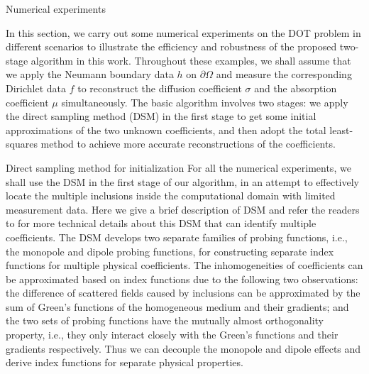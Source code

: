 \documentclass[11pt]{article}%
\renewcommand{\_}{{\fontfamily{ptm}\selectfont\textunderscore}}
\theoremstyle{plain}
\numberwithin{equation}{section}
\begin{document}
\begin{section}{Numerical experiments}\label{sec:Num}

In this section, we carry out some numerical experiments on the DOT problem in different scenarios to illustrate the efficiency 
and robustness of the proposed two-stage algorithm in this work.
Throughout these examples, we shall assume that we apply the Neumann boundary data $h$ on $\partial \Omega$ and measure the corresponding Dirichlet data $f$ to reconstruct the diffusion coefficient $\sigma$ and the absorption coefficient $\mu$ simultaneously. The basic algorithm involves two stages: 
we apply the direct sampling method (DSM) in the first stage to get some initial approximations of the two unknown coefficients, and then adopt the total least-squares method to achieve more accurate reconstructions of the coefficients. 

\begin{subsection}{Direct sampling method for initialization}
For all the numerical experiments, we shall use the DSM in the first stage of our algorithm, in an attempt 
to effectively locate the multiple inclusions inside the computational domain with limited measurement data. 
Here we give a brief description of DSM and refer the readers to \cite{chow2020direct} for more technical details 
about this DSM that can identify multiple coefficients.  The DSM develops two separate families of probing functions, 
i.e., the monopole and dipole probing functions, for constructing separate index functions for multiple physical coefficients. 
The inhomogeneities of coefficients can be approximated based on index functions  due to the following two observations: 
the difference of scattered fields caused by inclusions can be approximated by the sum of Green's functions of the homogeneous medium and their gradients; and the two sets of probing functions  have the mutually almost orthogonality property, i.e., they only interact closely with the Green's functions and their gradients respectively. Thus we can decouple the  monopole and dipole effects and derive index functions for separate physical properties.


\end{subsection}
\end{section}
\end{document}

